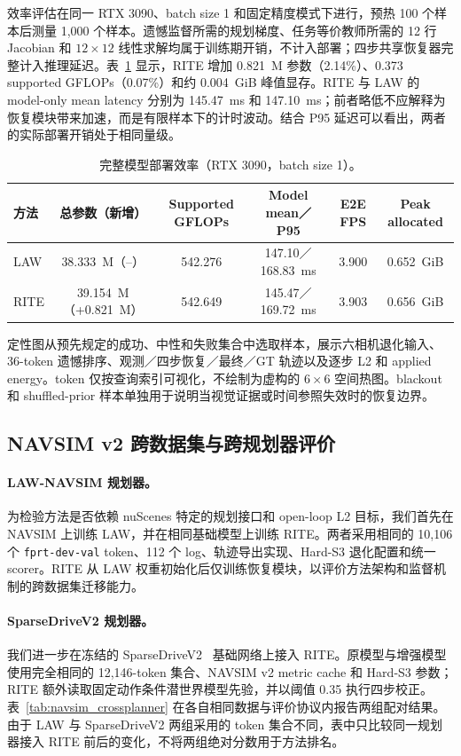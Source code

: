 \documentclass[letterpaper,10pt,conference]{ieeeconf}
\begin{document}
效率评估在同一 RTX 3090、batch size 1 和固定精度模式下进行，预热 100 个样本后测量 1,000 个样本。遗憾监督所需的规划梯度、任务等价教师所需的 12 行 Jacobian 和 $12\times12$ 线性求解均属于训练期开销，不计入部署；四步共享恢复器完整计入推理延迟。表~\ref{tab:efficiency} 显示，RITE 增加 0.821~M 参数（2.14\%）、0.373 supported GFLOPs（0.07\%）和约 0.004~GiB 峰值显存。RITE 与 LAW 的 model-only mean latency 分别为 145.47~ms 和 147.10~ms；前者略低不应解释为恢复模块带来加速，而是有限样本下的计时波动。结合 P95 延迟可以看出，两者的实际部署开销处于相同量级。

\begin{table}[t]
\caption{完整模型部署效率（RTX 3090，batch size 1）。}
\label{tab:efficiency}
\centering
\small
\begin{tabular}{lccccc}
\toprule
方法 & 总参数（新增） & Supported GFLOPs & Model mean／P95 & E2E FPS & Peak allocated \\
\midrule
LAW & 38.333~M（--） & 542.276 & 147.10／168.83~ms & 3.900 & 0.652~GiB \\
RITE & 39.154~M（+0.821~M） & 542.649 & 145.47／169.72~ms & 3.903 & 0.656~GiB \\
\bottomrule
\end{tabular}
\end{table}

定性图从预先规定的成功、中性和失败集合中选取样本，展示六相机退化输入、36-token 遗憾排序、观测／四步恢复／最终／GT 轨迹以及逐步 L2 和 applied energy。token 仅按查询索引可视化，不绘制为虚构的 $6\times6$ 空间热图。blackout 和 shuffled-prior 样本单独用于说明当视觉证据或时间参照失效时的恢复边界。

\subsection{NAVSIM v2 跨数据集与跨规划器评价}

\paragraph{LAW-NAVSIM 规划器。} 为检验方法是否依赖 nuScenes 特定的规划接口和 open-loop L2 目标，我们首先在 NAVSIM 上训练 LAW，并在相同基础模型上训练 RITE。两者采用相同的 10,106 个 \texttt{fprt-dev-val} token、112 个 log、轨迹导出实现、Hard-S3 退化配置和统一 scorer。RITE 从 LAW 权重初始化后仅训练恢复模块，以评价方法架构和监督机制的跨数据集迁移能力。

\paragraph{SparseDriveV2 规划器。} 我们进一步在冻结的 SparseDriveV2~\cite{sun2026sparsedrivev2} 基础网络上接入 RITE。原模型与增强模型使用完全相同的 12,146-token 集合、NAVSIM v2 metric cache 和 Hard-S3 参数；RITE 额外读取固定动作条件潜世界模型先验，并以阈值 0.35 执行四步校正。表~\ref{tab:navsim_crossplanner} 在各自相同数据与评价协议内报告两组配对结果。由于 LAW 与 SparseDriveV2 两组采用的 token 集合不同，表中只比较同一规划器接入 RITE 前后的变化，不将两组绝对分数用于方法排名。
\end{document}
